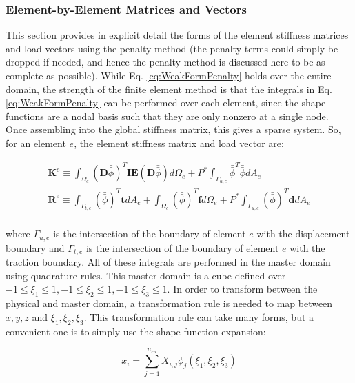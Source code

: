 \documentclass[10pt]{article}
\begin{document}
\subsubsection{Element-by-Element Matrices and Vectors}

This section provides in explicit detail the forms of the element stiffness matrices and load vectors using the penalty method (the penalty terms could simply be dropped if needed, and hence the penalty method is discussed here to be as complete as possible). While Eq. \eqref{eq:WeakFormPenalty} holds over the entire domain, the strength of the finite element method is that the integrals in Eq. \eqref{eq:WeakFormPenalty} can be performed over each element, since the shape functions are a nodal basis such that they are only nonzero at a single node. Once assembling into the global stiffness matrix, this gives a sparse system. So, for an element \(e\), the element stiffness matrix and load vector are:

\begin{tcolorbox}
\begin{equation}
\label{eq:FEWeakForm_element}
\begin{aligned}
\textbf{K}^e\equiv\int_{\Omega_e}(\textbf{D}\bar{\bar{\phi}})^T\textbf{IE}(\textbf{D}\bar{\bar{\phi}})d\Omega_e +P^{*}\int_{\Gamma_{u,e}}\bar{\bar{\phi}}^T\bar{\bar{\phi}}dA_e\\
\textbf{R}^e\equiv\int_{\Gamma_{t,e}}(\bar{\bar{\phi}})^T\textbf{t}dA_e+\int_{\Omega_e}(\bar{\bar{\phi}})^T\textbf{f}d\Omega_e+P^{*}\int_{\Gamma_{u,e}}(\bar{\bar{\phi}})^T\textbf{d}dA_e\\
\end{aligned}
\end{equation}
\end{tcolorbox}

where \(\Gamma_{u,e}\) is the intersection of the boundary of element \(e\) with the displacement boundary and \(\Gamma_{t,e}\) is the intersection of the boundary of element \(e\) with the traction boundary. All of these integrals are performed in the master domain using quadrature rules. This master domain is a cube defined over \(-1\leq\xi_1\leq1, -1\leq\xi_2\leq1, -1\leq\xi_3\leq1\). In order to transform between the physical and master domain, a transformation rule is needed to map between \(x,y,z\) and \(\xi_1,\xi_2,\xi_3\). This transformation rule can take many forms, but a convenient one is to simply use the shape function expansion:

\begin{equation}
x_i=\sum_{j=1}^{n_{en}}X_{i,j}\phi_j(\xi_1,\xi_2,\xi_3)
\end{equation}
\end{document}

